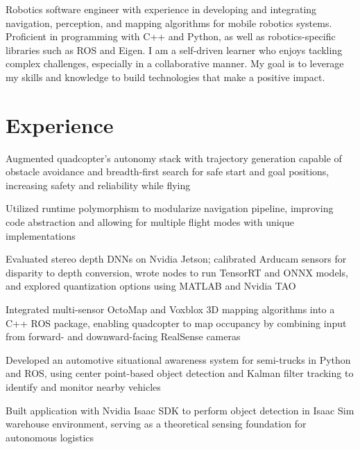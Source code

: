 \documentclass{resume}
\begin{document}


\begin{personalstatement}
  Robotics software engineer with experience in developing and integrating navigation,
  perception, and mapping algorithms for mobile robotics systems. Proficient in
  programming with C++ and Python, as well as robotics-specific libraries such as ROS and
  Eigen. I am a self-driven learner who enjoys tackling complex challenges, especially in
  a collaborative manner. My goal is to leverage my skills and knowledge to build
  technologies that make a positive impact.
\end{personalstatement}

\section{Experience}

\begin{details}
\item Augmented quadcopter’s autonomy stack with trajectory generation capable of
  obstacle avoidance and breadth-first search for safe start and goal positions,
  increasing safety and reliability while flying
\item Utilized runtime polymorphism to modularize navigation pipeline, improving code
  abstraction and allowing for multiple flight modes with unique implementations
\item Evaluated stereo depth DNNs on Nvidia Jetson; calibrated Arducam sensors for
  disparity to depth conversion, wrote nodes to run TensorRT and ONNX models, and
  explored quantization options using MATLAB and Nvidia TAO
\item Integrated multi-sensor OctoMap and Voxblox 3D mapping algorithms into a C++ ROS
  package, enabling quadcopter to map occupancy by combining input from forward- and
  downward-facing RealSense cameras
\end{details}

\begin{details}
\item Developed an automotive situational awareness system for semi-trucks in Python and
  ROS, using center point-based object detection and Kalman filter tracking to identify
  and monitor nearby vehicles
\item Built application with Nvidia Isaac SDK to perform object detection in Isaac Sim
  warehouse environment, serving as a theoretical sensing foundation for autonomous logistics
\end{details}
\end{document}
